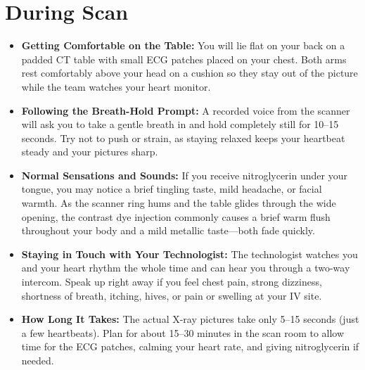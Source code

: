 \section{During Scan}
\begin{itemize}
    \item \textbf{Getting Comfortable on the Table:} You will lie flat on your back on a padded CT table with small ECG patches placed on your chest. Both arms rest comfortably above your head on a cushion so they stay out of the picture while the team watches your heart monitor.
    \item \textbf{Following the Breath-Hold Prompt:} A recorded voice from the scanner will ask you to take a gentle breath in and hold completely still for 10--15 seconds. Try not to push or strain, as staying relaxed keeps your heartbeat steady and your pictures sharp.
    \item \textbf{Normal Sensations and Sounds:} If you receive nitroglycerin under your tongue, you may notice a brief tingling taste, mild headache, or facial warmth. As the scanner ring hums and the table glides through the wide opening, the contrast dye injection commonly causes a brief warm flush throughout your body and a mild metallic taste---both fade quickly.
    \item \textbf{Staying in Touch with Your Technologist:} The technologist watches you and your heart rhythm the whole time and can hear you through a two-way intercom. Speak up right away if you feel chest pain, strong dizziness, shortness of breath, itching, hives, or pain or swelling at your IV site.
    \item \textbf{How Long It Takes:} The actual X-ray pictures take only 5--15 seconds (just a few heartbeats). Plan for about 15--30 minutes in the scan room to allow time for the ECG patches, calming your heart rate, and giving nitroglycerin if needed.
\end{itemize}


